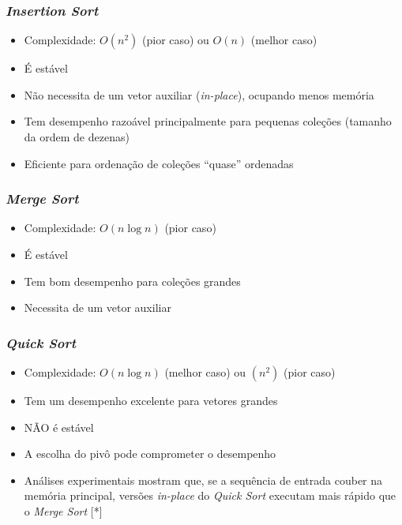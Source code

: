 \documentclass[aspectratio=169]{beamer}
\begin{document}
\begin{frame}\frametitle{\emph{Insertion Sort}}
\begin{itemize}
	\item Complexidade: $O(n^2)$ (pior caso) ou $O(n)$ (melhor caso)
	\item É estável
	\item Não necessita de um vetor auxiliar (\emph{in-place}), ocupando menos memória
	\item Tem desempenho razoável principalmente para pequenas coleções (tamanho da ordem de dezenas)
	\item Eficiente para ordenação de coleções ``quase'' ordenadas
\end{itemize}
\end{frame}

\begin{frame}\frametitle{\emph{Merge Sort}}
\begin{itemize}
	\item Complexidade: $O(n\log{n})$ (pior caso)
	\item É estável
	\item Tem bom desempenho para coleções grandes
	\item Necessita de um vetor auxiliar
\end{itemize}
\end{frame}

\begin{frame}\frametitle{\emph{Quick Sort}}
\begin{itemize}
	\item Complexidade: $O(n\log{n})$ (melhor caso) ou $(n^2)$ (pior caso)
	\item Tem um desempenho excelente para vetores grandes
	\item NÃO é estável
	\item A escolha do pivô pode comprometer o desempenho
	\item Análises experimentais mostram que, se a sequência de entrada couber na memória principal, versões \emph{in-place} do \emph{Quick Sort} executam mais rápido que o \emph{Merge Sort} [*]
\end{itemize}
\end{frame}
\end{document}

